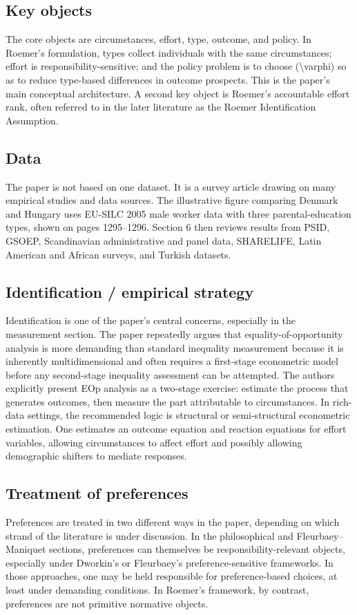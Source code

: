 \documentclass[11pt,a4paper]{article}
\begin{document}
\subsection*{Key objects}
The core objects are circumstances, effort, type, outcome, and policy. In Roemer’s formulation, types collect individuals with the same circumstances; effort is responsibility-sensitive; and the policy problem is to choose (\textbackslash{}varphi) so as to reduce type-based differences in outcome prospects. This is the paper’s main conceptual architecture. A second key object is Roemer’s accountable effort rank, often referred to in the later literature as the Roemer Identification Assumption.

\subsection*{Data}
The paper is not based on one dataset. It is a survey article drawing on many empirical studies and data sources. The illustrative figure comparing Denmark and Hungary uses EU-SILC 2005 male worker data with three parental-education types, shown on pages 1295–1296. Section 6 then reviews results from PSID, GSOEP, Scandinavian administrative and panel data, SHARELIFE, Latin American and African surveys, and Turkish datasets.

\subsection*{Identification / empirical strategy}
Identification is one of the paper’s central concerns, especially in the measurement section. The paper repeatedly argues that equality-of-opportunity analysis is more demanding than standard inequality measurement because it is inherently multidimensional and often requires a first-stage econometric model before any second-stage inequality assessment can be attempted. The authors explicitly present EOp analysis as a two-stage exercise: estimate the process that generates outcomes, then measure the part attributable to circumstances. In rich-data settings, the recommended logic is structural or semi-structural econometric estimation. One estimates an outcome equation and reaction equations for effort variables, allowing circumstances to affect effort and possibly allowing demographic shifters to mediate responses.

\subsection*{Treatment of preferences}
Preferences are treated in two different ways in the paper, depending on which strand of the literature is under discussion. In the philosophical and Fleurbaey–Maniquet sections, preferences can themselves be responsibility-relevant objects, especially under Dworkin’s or Fleurbaey’s preference-sensitive frameworks. In those approaches, one may be held responsible for preference-based choices, at least under demanding conditions. In Roemer’s framework, by contrast, preferences are not primitive normative objects.
\end{document}

